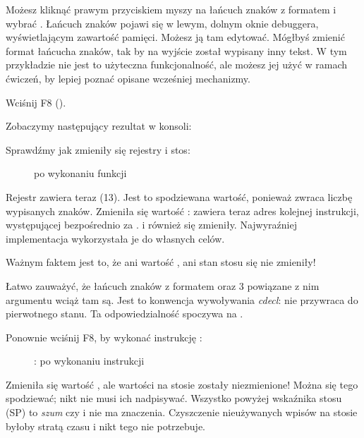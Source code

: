 Możesz kliknąć prawym przyciskiem myszy na łańcuch znaków z formatem i wybrać .
Łańcuch znaków pojawi się w lewym, dolnym oknie debuggera, wyświetlającym zawartość pamięci.
Możesz ją tam edytować.
Mógłbyś zmienić format łańcucha znaków, tak by na wyjście został wypisany inny tekst.
W tym przykładzie nie jest to użyteczna funkcjonalność, ale możesz jej użyć w ramach ćwiczeń, by lepiej poznać opisane wcześniej mechanizmy.

\clearpage
Wciśnij F8 (\stepover).

Zobaczymy następujący rezultat w konsoli:



Sprawdźmy jak zmieniły się rejestry i stos:

\begin{figure}[H]
\centering
{}
\caption{\olly po wykonaniu funkcji \printf{}}
\label{fig:printf3_olly_3}
\end{figure}

Rejestr \EAX zawiera teraz  (13).
Jest to spodziewana wartość, ponieważ \printf zwraca liczbę wypisanych znaków.
Zmieniła się wartość \EIP: zawiera teraz adres kolejnej instrukcji, występującej bezpośrednio za .
\ECX i \EDX również się zmieniły.
Najwyraźniej implementacja \printf wykorzystała je do własnych celów.

Ważnym faktem jest to, że ani wartość \ESP, ani stan stosu się nie zmieniły!

Łatwo zauważyć, że łańcuch znaków z formatem oraz 3 powiązane z nim argumentu wciąż tam są. Jest to konwencja wywoływania \emph{cdecl}:  nie przywraca \ESP do pierwotnego stanu.
Ta odpowiedzialność spoczywa na .

\clearpage
Ponownie wciśnij F8, by wykonać instrukcję :

\begin{figure}[H]
\centering
{}
\caption{\olly: po wykonaniu instrukcji }
\label{fig:printf3_olly_4}
\end{figure}

Zmieniła się wartość \ESP, ale wartości na stosie zostały niezmienione!
Można się tego spodziewać; nikt nie musi ich nadpisywać.
Wszystko powyżej wskaźnika stosu (\ac{SP}) to \emph{szum} czy \emph{\garbage{}} i nie ma znaczenia.
Czyszczenie nieużywanych wpisów na stosie byłoby stratą czasu i nikt tego nie potrzebuje.

